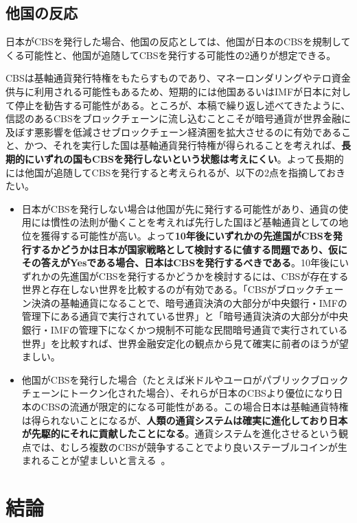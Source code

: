 \documentclass[dvipdfmx,a4paper]{jsarticle}
\begin{document}
\subsection{他国の反応}

日本がCBSを発行した場合、他国の反応としては、他国が日本のCBSを規制してくる可能性と、他国が追随してCBSを発行する可能性の2通りが想定できる。

CBSは基軸通貨発行特権をもたらすものであり、マネーロンダリングやテロ資金供与に利用される可能性もあるため、短期的には他国あるいはIMFが日本に対して停止を勧告する可能性がある。ところが、本稿で繰り返し述べてきたように、信認のあるCBSをブロックチェーンに流し込むことこそが暗号通貨が世界金融に及ぼす悪影響を低減させブロックチェーン経済圏を拡大させるのに有効であること、かつ、それを実行した国は基軸通貨発行特権が得られることを考えれば、\textbf{長期的にいずれの国もCBSを発行しないという状態は考えにくい}。よって長期的には他国が追随してCBSを発行すると考えられるが、以下の2点を指摘しておきたい。

\begin{itemize}
\item 日本がCBSを発行しない場合は他国が先に発行する可能性があり、通貨の使用には慣性の法則が働くことを考えれば先行した国ほど基軸通貨としての地位を獲得する可能性が高い。よって\textbf{10年後にいずれかの先進国がCBSを発行するかどうかは日本が国家戦略として検討するに値する問題であり、仮にその答えがYesである場合、日本はCBSを発行するべきである}。10年後にいずれかの先進国がCBSを発行するかどうかを検討するには、CBSが存在する世界と存在しない世界を比較するのが有効である。「CBSがブロックチェーン決済の基軸通貨になることで、暗号通貨決済の大部分が中央銀行・IMFの管理下にある通貨で実行されている世界」と「暗号通貨決済の大部分が中央銀行・IMFの管理下になくかつ規制不可能な民間暗号通貨で実行されている世界」を比較すれば、世界金融安定化の観点から見て確実に前者のほうが望ましい。
\item 他国がCBSを発行した場合（たとえば米ドルやユーロがパブリックブロックチェーンにトークン化された場合）、それらが日本のCBSより優位になり日本のCBSの流通が限定的になる可能性がある。この場合日本は基軸通貨特権は得られないことになるが、\textbf{人類の通貨システムは確実に進化しており日本が先駆的にそれに貢献したことになる}。通貨システムを進化させるという観点では、むしろ複数のCBSが競争することでより良いステーブルコインが生まれることが望ましいと言える~\cite{hayek2009denationalisation}。
\end{itemize}

\section{結論}
\end{document}
